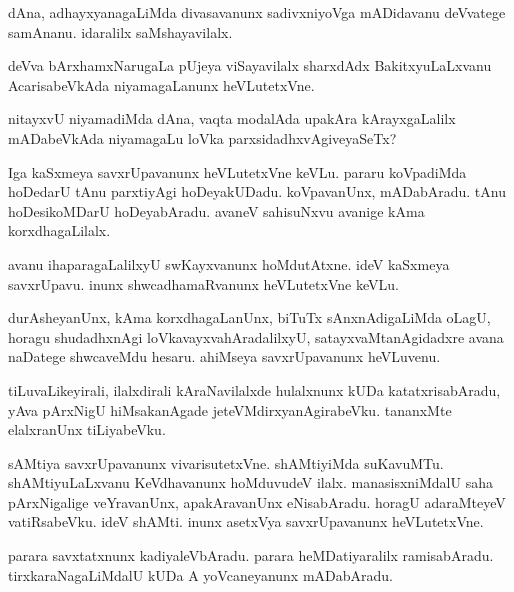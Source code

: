 \documentclass{article}
\begin{document}
\begin{mn}
dAna, adhayxyanagaLiMda divasavanunx sadivxniyoVga mADidavanu deVvatege samAnanu.
 idaralilx saMshayavilalx.
\end{mn}

\begin{mn}
deVva bArxhamxNarugaLa pUjeya viSayavilalx  sharxdAdx BakitxyuLaLxvanu AcarisabeVkAda 
niyamagaLanunx  heVLutetxVne.
\end{mn}

\begin{mn}
nitayxvU niyamadiMda dAna, vaqta modalAda upakAra kArayxgaLalilx mADabeVkAda 
niyamagaLu  loVka parxsidadhxvAgiveyaSeTx?
\end{mn}

\begin{mn}
Iga kaSxmeya savxrUpavanunx  heVLutetxVne keVLu. pararu koVpadiMda hoDedarU 
tAnu parxtiyAgi hoDeyakUDadu. koVpavanUnx, mADabAradu. tAnu hoDesikoMDarU 
hoDeyabAradu. avaneV sahisuNxvu avanige kAma korxdhagaLilalx. 
\end{mn}

\begin{mn}
avanu  ihaparagaLalilxyU swKayxvanunx hoMdutAtxne.  ideV kaSxmeya savxrUpavu. 
inunx shwcadhamaRvanunx heVLutetxVne keVLu.
\end{mn}

\begin{mn}
durAsheyanUnx, kAma korxdhagaLanUnx, biTuTx sAnxnAdigaLiMda oLagU, horagu 
shudadhxnAgi  loVkavayxvahAradalilxyU, satayxvaMtanAgidadxre avana naDatege 
shwcaveMdu hesaru.  ahiMseya savxrUpavanunx heVLuvenu.
\end{mn}

\begin{mn}
tiLuvaLikeyirali,  ilalxdirali kAraNavilalxde hulalxnunx kUDa katatxrisabAradu, 
yAva  pArxNigU  hiMsakanAgade jeteVMdirxyanAgirabeVku. tananxMte elalxranUnx tiLiyabeVku.
\end{mn}

\begin{mn}
sAMtiya savxrUpavanunx vivarisutetxVne.  shAMtiyiMda suKavuMTu.  shAMtiyuLaLxvanu 
KeVdhavanunx hoMduvudeV ilalx.  manasisxniMdalU saha pArxNigalige veYravanUnx,
 apakAravanUnx  eNisabAradu. horagU adaraMteyeV vatiRsabeVku.  ideV shAMti. 
 inunx asetxVya savxrUpavanunx heVLutetxVne.
\end{mn}

\begin{mn}
parara savxtatxnunx kadiyaleVbAradu.  parara heMDatiyaralilx ramisabAradu. 
tirxkaraNagaLiMdalU kUDa A yoVcaneyanunx mADabAradu.  
\end{mn}
\end{document}
